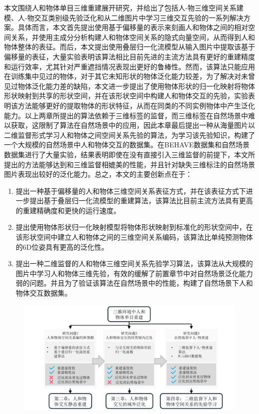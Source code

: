 本文围绕人和物体单目三维重建展开研究，并给出了包括人-物三维空间关系建模、人-物交互类别级先验泛化和从二维图片中学习三维交互先验的一系列解决方案。具体而言，本文首先提出使用基于偏移量的表示来刻画人和物体之间的相对空间关系，并使用主成分分析构建人和物体空间关系的隐式向量空间，从而得到人和物体整体的表征。而后，本文提出使用叠层归一化流模型从输入图片中提取该基于偏移量的表征，大量实验表明该算法相比目前先进的主流方法具有更好的重建精度和运行效率，尤其针对严重遮挡情况表现出更好的鲁棒性。然而，该算法只能应用在训练集中见过的物体，对于其它未知形状的物体泛化能力较差，为了解决对未曾见过物体泛化能力差的缺陷，本文进一步提出了使用物体形状的归一化映射将物体形状映射到共享的形状空间，并在该形状空间中构建人和物体交互的先验，实验表明该方法能够更好的提取物体的形状特征，从而在同类的不同实例物体中产生泛化能力。以上两章所提出的算法依赖于三维标签的监督，而三维标签在自然场景中难以获取，这限制了算法在自然场景中的应用，因此本章最后提出一种从海量图片以二维监督形式学习人和物体之间空间关系先验的算法，为学习该先验知识，构建了一个大规模的自然场景中人和物体交互的数据集。在BEHAVE数据集和自然场景数据集进行了大量实验，结果表明即使在没有直接引入三维监督的前提下，本文所提出的方法能够达到和三维监督相媲美的性能，并且针对缺失三维标注的自然场景图片表现出较好的泛化能力。总之，本文的主要创新点在于：
\begin{enumerate}
	\item 提出一种基于偏移量的人和物体三维空间关系表征方式，并在该表征方式下进一步提出基于叠层归一化流模型的重建算法，该算法比目前主流方法具有更高的重建精确度和更快的运行速度。
	\item 提出使用物体形状归一化映射模型将物体形状映射到标准化的形状空间中，在该形状空间中建立人和物体之间的三维空间关系编码，该算法比单纯预测物体的6D位姿具有更高的泛化性。
	\item 提出一种二维监督的人和物体三维空间关系先验学习算法，该算法从大规模的图片中学习人和物体三维先验，有效的缓解了前置章节中对自然场景泛化能力弱的问题。并且为了验证该算法在自然场景中的性能，构建了自然场景下人和物体交互数据集。
\end{enumerate}

\begin{figure}[!htbp]
	\centering
	\includegraphics{Img/paper_structure}
	\label{fig:structure}
\end{figure}

